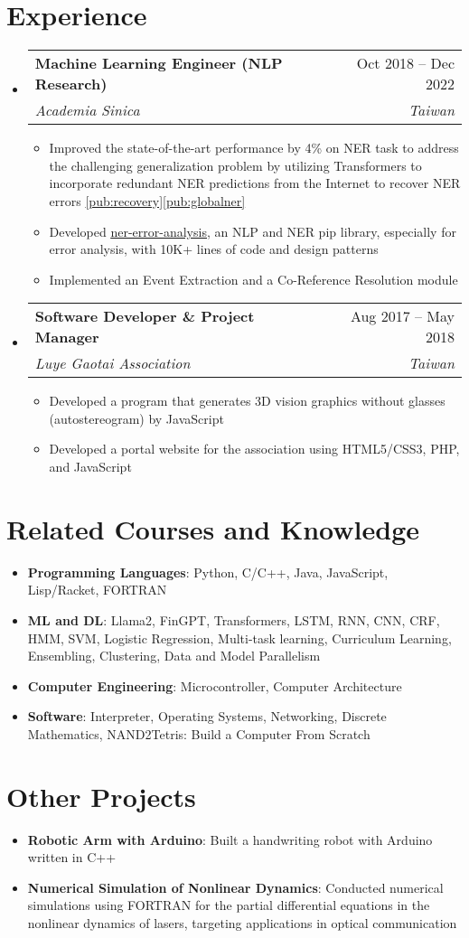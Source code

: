 \documentclass[letterpaper,11pt]{article}
\makeatletter
\newcommand{\resumeItem}[1]{
  \item\small{
    {#1 \vspace{-2pt}}
  }
}
\newcommand{\resumeSubheading}[4]{
  \vspace{-2pt}\item
    \begin{tabular*}{0.97\textwidth}[t]{l@{\extracolsep{\fill}}r}
      \textbf{#1} & #2 \\
      \textit{\small#3} & \textit{\small #4} \\
    \end{tabular*}\vspace{-7pt}
}
\newcommand{\resumeSubHeadingListStart}{\begin{itemize}[leftmargin=0.1in, label={}]}
\newcommand{\resumeSubHeadingListEnd}{\end{itemize}}
\newcommand{\resumeItemListStart}{\begin{itemize}}
\newcommand{\resumeItemListEnd}{\end{itemize}\vspace{-5pt}}
\newcommand{\titledItem}[2]{
  \item\small{
    {\textbf{#1}: #2 \vspace{-9pt}}
  }
}
\newcommand{\simpleListStart}{\begin{itemize}[leftmargin=0.15in, label={}]}
\newcommand{\simpleListEnd}{\end{itemize}\vspace{-5pt}}
\makeatother
\begin{document}
\section{Experience}
  \resumeSubHeadingListStart

    \resumeSubheading
      {Machine Learning Engineer (NLP Research)}{Oct 2018 -- Dec 2022}
      {Academia Sinica}{Taiwan}
      \resumeItemListStart
        \resumeItem{Improved the state-of-the-art performance by 4\% on NER task to address the challenging generalization problem by utilizing Transformers to incorporate redundant NER predictions from the Internet to recover NER errors \ref{pub:recovery}\ref{pub:globalner}}
        \resumeItem{Developed \href{https://pypi.org/project/ner-error-analysis/}{\underline{ner-error-analysis}}, an NLP and NER pip library, especially for error analysis, with 10K+ lines of code and design patterns}
        \resumeItem{Implemented an Event Extraction and a Co-Reference Resolution module}
      \resumeItemListEnd
      \resumeSubheading
          {Software Developer \& Project Manager}{Aug 2017 -- May 2018}{Luye Gaotai Association}{Taiwan}
          \resumeItemListStart
            \resumeItem{Developed a program that generates 3D vision graphics without glasses (autostereogram) by JavaScript}
            \resumeItem{Developed a portal website for the association using HTML5/CSS3, PHP, and JavaScript}
          \resumeItemListEnd
  \resumeSubHeadingListEnd

\section{Related Courses and Knowledge}
 \simpleListStart
    \titledItem{Programming Languages}{Python, C/C++, Java, JavaScript, Lisp/Racket, FORTRAN}
    \titledItem{ML and DL}{Llama2, FinGPT, Transformers, LSTM, RNN, CNN, CRF, HMM, SVM, Logistic Regression, Multi-task learning, Curriculum Learning, Ensembling, Clustering, Data and Model Parallelism}
    \titledItem{Computer Engineering}{Microcontroller, Computer Architecture}
    \titledItem{Software}{Interpreter, Operating Systems, Networking, Discrete Mathematics, NAND2Tetris: Build a Computer From Scratch}
 \simpleListEnd

 \section{Other Projects}
    \simpleListStart
        \titledItem{Robotic Arm with Arduino}{Built a handwriting robot with Arduino written in C++}
        \titledItem{Numerical Simulation of Nonlinear Dynamics}{Conducted numerical simulations using FORTRAN for the partial differential equations in the nonlinear dynamics of lasers, targeting applications in optical communication}
    \simpleListEnd
\end{document}

